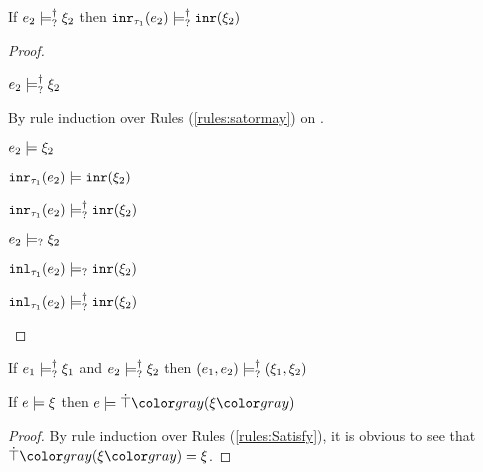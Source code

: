 \begin{lem}
  \label{lem:satormay-inr}
  If $e_2 \models_{?}^{\dag} \xi_2$ then $\mathtt{inr}_{\tau_1}({e_2}) \models_{?}^{\dag} \mathtt{inr}(\xi_2)$
\end{lem}
\begin{proof}
  \begin{pfsteps*}
  \item $e_2 \models_{?}^{\dag} \xi_2$  
  \end{pfsteps*}
  By rule induction over Rules (\ref{rules:satormay}) on .
  \begin{byCases}

  \item[\text{(\ref{rule:CSMSSat})}]
    \begin{pfsteps*}
    \item $e_2 \models \xi_2$  
    \item $\mathtt{inr}_{\tau_1}({e_2}) \models \mathtt{inr}(\xi_2)$  
    \item $\mathtt{inr}_{\tau_1}({e_2}) \models_{?}^{\dag} \mathtt{inr}(\xi_2)$ 
    \end{pfsteps*}

  \item[\text{(\ref{rule:CSMSMay})}]
    \begin{pfsteps*}
    \item $e_2 \models_{?} \xi_2$  
    \item $\mathtt{inl}_{\tau_1}({e_2}) \models_{?} \mathtt{inr}(\xi_2)$  
    \item $\mathtt{inl}_{\tau_1}({e_2}) \models_{?}^{\dag} \mathtt{inr}(\xi_2)$ 
    \end{pfsteps*}
  \end{byCases}
  \resetpfcounter
\end{proof}

\begin{lem}
  \label{lem:satormay-pair}
  If $e_1 \models_{?}^{\dag} \xi_1$ and $e_2 \models_{?}^{\dag} \xi_2$ then $(e_1 , e_2) \models_{?}^{\dag} (\xi_1 , \xi_2)$
\end{lem}

\begin{lem}
  \label{lem:satisfy-truify}
  If $e \models \xi$ then $\csatisfy{e}{\ctruify{\xi}}$
\end{lem}
\begin{proof}
  By rule induction over Rules (\ref{rules:Satisfy}), it is obvious to see that $\ctruify{\xi} = \xi$.
\end{proof}

